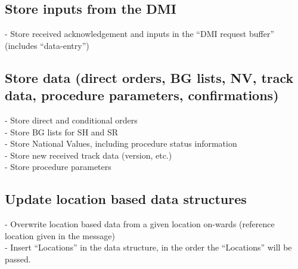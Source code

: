 \documentclass{template/openetcs_report}
\begin{document}
\subsection{Store inputs from the \gls{DMI}}
- Store received acknowledgement and inputs in the “\gls{DMI} request buffer” (includes “data-entry”)\\

\subsection{Store data (direct orders, \gls{BG} lists, NV, track data, procedure parameters, confirmations)}
- Store direct and conditional orders\\
- Store \gls{BG} lists for SH and SR\\
- Store National Values, including procedure status information\\
- Store new received track data (version, etc.)\\
- Store procedure parameters\\

\subsection{Update location based data structures}
- Overwrite location based data from a given location on-wards (reference location given in the message)\\
- Insert “Locations” in the data structure, in the order the “Locations” will be passed.\\
\end{document}
